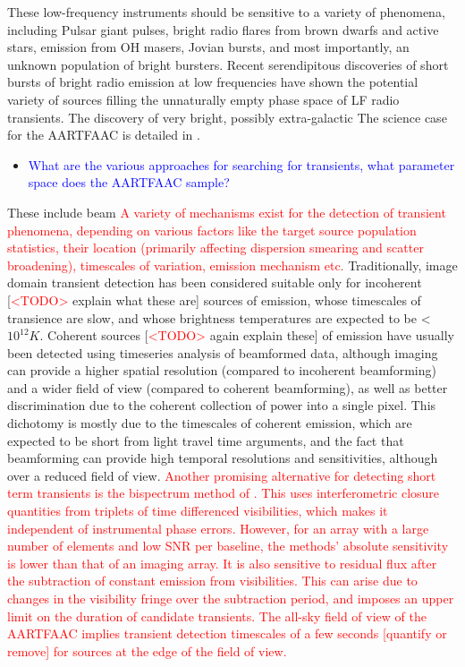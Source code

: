 \documentclass{aa}
\begin{document}
These low-frequency instruments should be sensitive to a variety of
phenomena, including Pulsar giant pulses, bright radio flares from
brown dwarfs and active stars, emission from OH masers, Jovian bursts,
and most importantly, an unknown population of bright bursters. Recent
serendipitous discoveries of short bursts of bright radio emission
at low frequencies\citep{lorimer2007bright} have shown the potential
variety of sources filling the unnaturally empty phase space of LF
radio transients. The discovery of very bright, possibly extra-galactic
 The science case for the AARTFAAC is detailed in \citep{wijers2013aartfaac}.
\begin{itemize}
\item \textcolor{blue}{What are the various approaches for searching for
transients, what parameter space does the AARTFAAC sample?}
\end{itemize}
These include beam
\textcolor{red}{A variety of mechanisms exist for the detection of
transient phenomena, depending on various factors like the target
source population statistics, their location (primarily affecting
dispersion smearing and scatter broadening), timescales of variation,
emission mechanism etc.} Traditionally, image domain transient detection
has been considered suitable only for incoherent {[}\textcolor{red}{<TODO>}
explain what these are{]} sources of emission, whose timescales of
transience are slow, and whose brightness temperatures are expected
to be <$10^{12}K$. Coherent sources {[}\textcolor{red}{<TODO>} again
explain these{]} of emission have usually been detected using timeseries
analysis of beamformed data, although imaging can provide a higher
spatial resolution (compared to incoherent beamforming) and a wider
field of view (compared to coherent beamforming), as well as better
discrimination due to the coherent collection of power into a single
pixel. This dichotomy is mostly due to the timescales of coherent
emission, which are expected to be short from light travel time arguments,
and the fact that beamforming can provide high temporal resolutions
and sensitivities, although over a reduced field of view. \textcolor{red}{Another
promising alternative for detecting short term transients is the bispectrum
method of \citep{law2012all}. This uses interferometric closure quantities
from triplets of time differenced visibilities, which makes it independent
of instrumental phase errors. However, for an array with a large number
of elements and low SNR per baseline, the methods' absolute sensitivity
is lower than that of an imaging array. It is also sensitive to residual
flux after the subtraction of constant emission from visibilities.
This can arise due to changes in the visibility fringe over the subtraction
period, and imposes an upper limit on the duration of candidate transients.
The all-sky field of view of the AARTFAAC implies transient detection
timescales of a few seconds {[}quantify or remove{]} for sources at
the edge of the field of view.}
\end{document}
